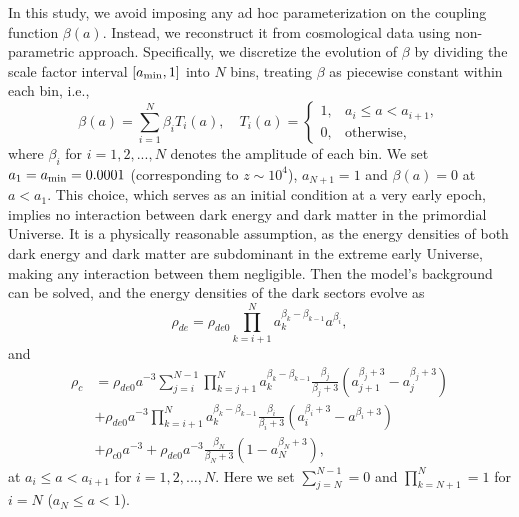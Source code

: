 \documentclass[a4paper,11pt]{article}
\begin{document}
In this study, we avoid imposing any ad hoc parameterization on the coupling function $\beta(a)$. Instead, we reconstruct it from cosmological data using non-parametric approach. Specifically, we discretize the evolution of $\beta$ by dividing the scale factor interval $[a_{\rm min},1]$ into $N$ bins, treating $\beta$ as piecewise constant within each bin, i.e., 
\begin{equation}
  \beta(a)=\sum_{i=1}^N \beta_i T_i(a),
\quad 
T_i(a)=\begin{cases}1,&a_{i}\leq a<a_{i+1},\\0,&\text{otherwise},\end{cases}
\end{equation}
where $\beta_i$ for $i=1,2,...,N$ denotes the amplitude of each bin. {We set $a_1=a_{\rm min}=0.0001$ (corresponding to $z \sim 10^4$), $a_{N+1}=1$ and $\beta(a)=0$ at $a<a_1$. This choice, which serves as an initial condition at a very early epoch, implies no interaction between dark energy and dark matter in the primordial Universe. It is a physically reasonable assumption, as the energy densities of both dark energy and dark matter are subdominant in the extreme early Universe, making any interaction between them negligible.} Then the model's background can be solved, and the energy densities of the dark sectors evolve as
\begin{equation}
  \rho_{de}=\rho_{de0}\prod_{k=i+1}^{N}{a_k^{\beta_k -\beta_{k-1}}}a^{\beta_{i}},
\end{equation} 
and
\begin{align}
  \rho_{c}&= \rho_{de0}a^{-3}\sum_{j=i}^{N-1}\prod_{k=j+1}^{N}{a_k^{\beta_k -\beta_{k-1}}} \frac{\beta_{j}}{\beta_{j} + 3}\left(a_{j+1}^{\beta_{j}+3}-a_{j}^{\beta_{j}+3}\right) \nonumber \\ 
    &+\rho_{de0}a^{-3}\prod_{k=i+1}^{N}{a_k^{\beta_k -\beta_{k-1}}} \frac{\beta_{i}}{\beta_{i} + 3}\left(a_{i}^{\beta_{i}+3}-a^{\beta_{i}+3}\right) \nonumber \\
    &+\rho_{c0}a^{-3} +\rho_{de0}a^{-3}\frac{\beta_{N}}{\beta_{N} + 3}(1-a_N^{\beta_N+3}),
\end{align}
at $a_i\leq a<a_{i+1}$ for $i=1,2,...,N$. Here we set $\sum_{j=N}^{N-1}=0$ and $\prod_{k=N+1}^{N}=1$ for $i=N$ ($a_N\leq a<1$).
\end{document}
